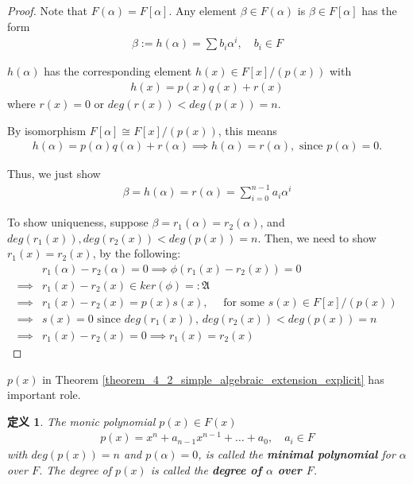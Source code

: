 \documentclass[utf8]{ctexbook}
\newtheorem{definition}{定义}[section]
\begin{document}
\begin{proof}
Note that $F(\alpha) = F[\alpha]$. Any element $\beta \in F(\alpha)$ is $\beta \in F[\alpha]$ has the form
\begin{align*}
\beta := h(\alpha) = \sum b_i \alpha^i, \quad b_i \in F
\end{align*}

$h(\alpha)$ has the corresponding element $h(x) \in F[x]/(p(x))$ with
\begin{align*}
h(x) = p(x) q(x) + r(x)
\end{align*}
where $r(x) =0$ or $deg(r(x)) < deg(p(x)) = n$.

By isomorphism $F[\alpha] \cong F[x]/(p(x))$, this means
\begin{align*}
h(\alpha) = p(\alpha) q(\alpha) + r(\alpha) \implies h(\alpha) = r(\alpha), \mbox{ since } p(\alpha) = 0.
\end{align*}

Thus, we just show
\begin{align*}
\beta = h(\alpha) = r(\alpha) = \sum_{i=0} ^{n-1} a_i \alpha^i
\end{align*}

To show uniqueness, suppose $\beta = r_1 (\alpha) = r_2 (\alpha)$, and $deg(r_1(x)) , deg(r_2(x)) < deg(p(x)) = n$. Then, we need to show $r_1 (x) = r_2 (x)$, by the following:
\begin{align*}
& r_1 (\alpha) - r_2 (\alpha) = 0 \implies \phi ( r_1(x) - r_2 (x)) = 0 \\
\implies & r_1(x) - r_2 (x) \in ker(\phi) =: \mathfrak{A} \\
\implies & r_1 (x) - r_2 (x) = p(x) s(x), \quad \mbox{ for some } s(x) \in F[x]/(p(x)) \\
\implies & s(x) =0 \mbox{ since }deg(r_1(x)) ,\,  deg(r_2(x)) < deg(p(x)) = n \\
\implies & r_1 (x) - r_2 (x) = 0 \implies r_1 (x) = r_2 (x)
\end{align*}

\end{proof}

$p(x)$ in Theorem \ref{theorem_4_2_simple_algebraic_extension_explicit} has important role.

\begin{definition}
\label{def_4_2_minimal_poly}
The monic polynomial $p(x) \in F(x)$ 
\begin{align*}
p(x) = x^n + a_{n-1} x^{n-1} + \ldots + a_0, \quad a_i \in F
\end{align*} 
with $deg(p(x))=n$ and $p(\alpha)=0$, is called the \textbf{minimal polynomial} for $\alpha$ over $F$. The degree of $p(x)$ is called the \textbf{degree of $\alpha$ over $F$}.
\end{definition}
\end{document}
